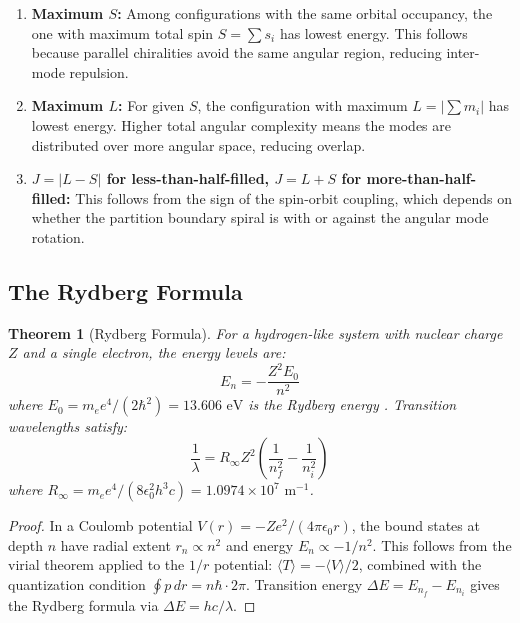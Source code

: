 \documentclass[11pt,a4paper]{article}
\newtheorem{theorem}{Theorem}[section]
\theoremstyle{definition}
\theoremstyle{remark}
\begin{document}
\begin{enumerate}
\item \textbf{Maximum $S$:} Among configurations with the same orbital occupancy, the one with maximum total spin $S = \sum s_i$ has lowest energy. This follows because parallel chiralities avoid the same angular region, reducing inter-mode repulsion.
\item \textbf{Maximum $L$:} For given $S$, the configuration with maximum $L = |\sum m_i|$ has lowest energy. Higher total angular complexity means the modes are distributed over more angular space, reducing overlap.
\item \textbf{$J = |L - S|$ for less-than-half-filled, $J = L + S$ for more-than-half-filled:} This follows from the sign of the spin-orbit coupling, which depends on whether the partition boundary spiral is with or against the angular mode rotation.
\end{enumerate}

\subsection{The Rydberg Formula}

\begin{theorem}[Rydberg Formula]
\label{thm:rydberg}
For a hydrogen-like system with nuclear charge $Z$ and a single electron, the energy levels are:
\begin{equation}
E_n = -\frac{Z^2 E_0}{n^2}
\label{eq:rydberg_energy}
\end{equation}
where $E_0 = m_e e^4 / (2\hbar^2) = 13.606 \text{ eV}$ is the Rydberg energy \citep{rydberg1890}. Transition wavelengths satisfy:
\begin{equation}
\frac{1}{\lambda} = R_\infty Z^2 \left(\frac{1}{n_f^2} - \frac{1}{n_i^2}\right)
\label{eq:rydberg}
\end{equation}
where $R_\infty = m_e e^4 / (8 \epsilon_0^2 h^3 c) = 1.0974 \times 10^7 \text{ m}^{-1}$.
\end{theorem}

\begin{proof}
In a Coulomb potential $V(r) = -Ze^2/(4\pi\epsilon_0 r)$, the bound states at depth $n$ have radial extent $r_n \propto n^2$ and energy $E_n \propto -1/n^2$. This follows from the virial theorem applied to the $1/r$ potential: $\langle T \rangle = -\langle V \rangle / 2$, combined with the quantization condition $\oint p \, dr = n\hbar \cdot 2\pi$. Transition energy $\Delta E = E_{n_f} - E_{n_i}$ gives the Rydberg formula via $\Delta E = hc/\lambda$.
\end{proof}
\end{document}
